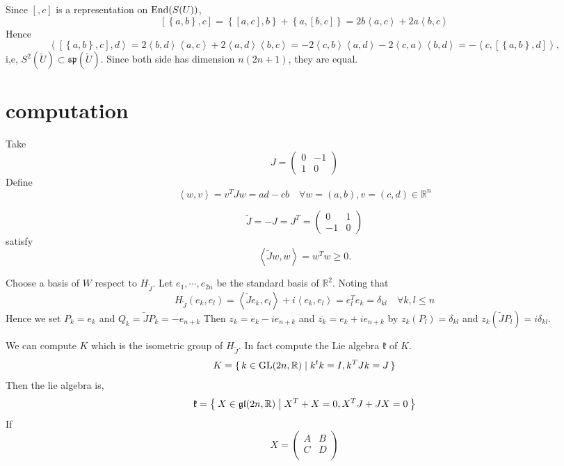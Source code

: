 \documentclass[12pt]{article}
\def\End{{\rm End}}
\def\bR{{\mathbb{R}}}
\def\sp{{\mathfrak{sp}}}
\def\inn#1#2{\left\langle{#1},{#2}\right\rangle}
\def\tJ{{\widetilde{J}}}
\def\agl{\mathfrak{gl}}
\def\fkk{\mathfrak{k}}
\def\GL{\mathrm{GL}}
\def\tU{{\widetilde{U}}}
\def\cmm#1#2{\left[{#1},{#2}\right]}
\def\acmm#1#2{\left\{{#1},{#2}\right\}}
\begin{document}
Since $[,c]$ is a representation on $\End(S(U))$, 
\[
\cmm{\acmm{a}{b}}{c}
= \acmm{\cmm{a}{c}}{b} + \acmm{a}{\cmm{b}{c}}
= 2b\inn{a}{c} + 2a \inn{b}{c}
\]
Hence
\[
\inn{\cmm{\acmm{a}{b}}{c}}{d}
= 2\inn{b}{d}\inn{a}{c} + 2\inn{a}{d}\inn{b}{c}
= -2\inn{c}{b}\inn{a}{d} -2\inn{c}{a}\inn{b}{d}
=-\inn{c}{\cmm{\acmm{a}{b}}{d}},
\]
i,e, $S^2(\tU) \subset \sp(\tU)$. Since both side has dimension $n(2n+1)$,
they are equal. 

\section{computation}
Take 
\[
J = \begin{pmatrix} 0 & -1\\1 & 0
\end{pmatrix}
\]
Define 
\[
\inn{w}{v} = v^T J w = ad - cb \quad \forall w = (a,b), v = (c,d) \in \bR^n
\]

\[
\tJ = -J = J^T = 
\begin{pmatrix}
  0 & 1 \\ -1 & 0
\end{pmatrix}
\]
satisfy 
\[
\inn{\tJ w}{w} = w^T w \geq 0.
\]

Choose a basis of $W$ respect to $H_\tJ$.
Let $e_1, \cdots, e_{2n}$ be the standard basis of $\bR^2$.
Noting that 
\[
H_\tJ(e_k,e_l) = \inn{\tJ e_k}{e_l}+i\inn{e_k}{e_l}
= e_l^T e_k =\delta_{kl} \quad \forall k,l \leq n
\]
Hence we set $P_k = e_k$ and $Q_k = \tJ P_k = -e_{n+k}$
Then $z_k = e_k - i e_{n+k}$ and $\overline{z_k} = e_k +i e_{n+k}$
by $z_k(P_l) = \delta_{kl}$ and $z_k(\tJ P_l)= i\delta_{kl}$.

We can compute $K$ which is the isometric group of $H_\tJ$.
In fact compute the Lie algebra $\fkk$ of $K$. 
\[
K = \set{k  \in \GL(2n,\bR)|k^tk = I, k^TJk = J }
\]
Then the lie algebra is,
\[
\fkk = \Set{X\in \agl(2n,\bR)|X^T + X  = 0, X^TJ + JX = 0}
\]
If
\[
X = \begin{pmatrix} A & B \\ C & D \\
\end{pmatrix}
\]
\end{document}
